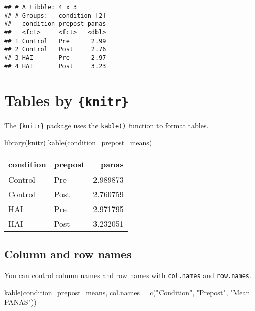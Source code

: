 \documentclass[
  doc]{apa6}
\newenvironment{Shaded}{\begin{snugshade}}{\end{snugshade}}
\newcommand{\AttributeTok}[1]{\textcolor[rgb]{0.77,0.63,0.00}{#1}}
\newcommand{\FunctionTok}[1]{\textcolor[rgb]{0.00,0.00,0.00}{#1}}
\newcommand{\NormalTok}[1]{#1}
\newcommand{\StringTok}[1]{\textcolor[rgb]{0.31,0.60,0.02}{#1}}
\begin{document}
\begin{verbatim}
## # A tibble: 4 x 3
## # Groups:   condition [2]
##   condition prepost panas
##   <fct>     <fct>   <dbl>
## 1 Control   Pre      2.99
## 2 Control   Post     2.76
## 3 HAI       Pre      2.97
## 4 HAI       Post     3.23
\end{verbatim}

\newpage

\hypertarget{tables-by-knitr}{%
\section{\texorpdfstring{Tables by \texttt{\{knitr\}}}{Tables by \{knitr\}}}\label{tables-by-knitr}}

The \href{https://yihui.org/knitr/}{\texttt{\{knitr\}}} package uses the \texttt{kable()} function to format tables.

\begin{Shaded}
\begin{Highlighting}[]
\FunctionTok{library}\NormalTok{(knitr)}
\FunctionTok{kable}\NormalTok{(condition\_prepost\_means)}
\end{Highlighting}
\end{Shaded}

\begin{tabular}{l|l|r}
\hline
condition & prepost & panas\\
\hline
Control & Pre & 2.989873\\
\hline
Control & Post & 2.760759\\
\hline
HAI & Pre & 2.971795\\
\hline
HAI & Post & 3.232051\\
\hline
\end{tabular}

\newpage

\hypertarget{column-and-row-names}{%
\subsection{Column and row names}\label{column-and-row-names}}

You can control column names and row names with \texttt{col.names} and \texttt{row.names}.

\begin{Shaded}
\begin{Highlighting}[]
\FunctionTok{kable}\NormalTok{(condition\_prepost\_means, }
      \AttributeTok{col.names =} \FunctionTok{c}\NormalTok{(}\StringTok{"Condition"}\NormalTok{, }\StringTok{"Prepost"}\NormalTok{, }\StringTok{"Mean PANAS"}\NormalTok{))}
\end{Highlighting}
\end{Shaded}
\end{document}
